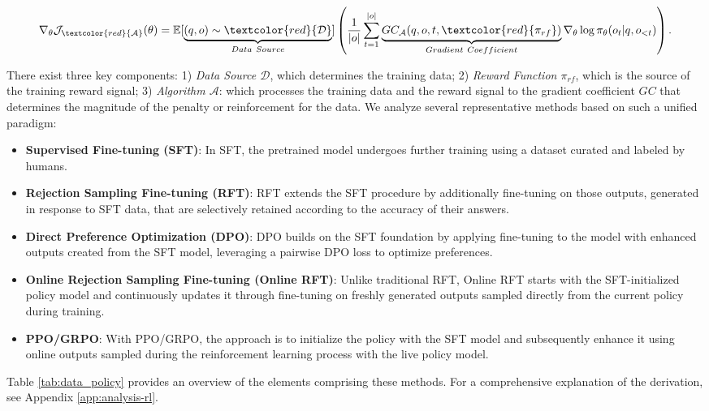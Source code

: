 \begin{itemize}[topsep=0pt]
\begin{itemize}[topsep=0pt]
\begin{equation}
    \nabla_{\theta}\mathcal{J}_{\textcolor{red}{\mathcal{A}}}(\theta) = \mathbb{E}[\underbrace{(q,o) \sim \textcolor{red}{\mathcal{D}}}_{Data \ Source}]\left( \frac{1}{|o|} \sum_{t=1}^{|o|}  \underbrace{GC_{{\mathcal{A}}}(q, o, t, \textcolor{red}{\pi_{{rf}}})}_{Gradient \ Coefficient}  \nabla_{\theta}\log \pi_{\theta}(o_t | q, o_{<t})\right).
\label{eq:objective}
\end{equation}

There exist three key components: 1) \textit{Data Source $\mathcal{D}$}, which determines the training data; 2) \textit{Reward Function $\pi_{{rf}}$}, which is the source of the training reward signal; 3) \textit{Algorithm $\mathcal{A}$}: which processes the training data and the reward signal to the gradient coefficient $GC$ that determines the magnitude of the penalty or reinforcement for the data. We analyze several representative methods based on such a unified paradigm:

\begin{itemize}
    \item \textbf{Supervised Fine-tuning (SFT)}: In SFT, the pretrained model undergoes further training using a dataset curated and labeled by humans.
    \item \textbf{Rejection Sampling Fine-tuning (RFT)}: RFT extends the SFT procedure by additionally fine-tuning on those outputs, generated in response to SFT data, that are selectively retained according to the accuracy of their answers.
    \item \textbf{Direct Preference Optimization (DPO)}: DPO builds on the SFT foundation by applying fine-tuning to the model with enhanced outputs created from the SFT model, leveraging a pairwise DPO loss to optimize preferences.
    \item \textbf{Online Rejection Sampling Fine-tuning (Online RFT)}: Unlike traditional RFT, Online RFT starts with the SFT-initialized policy model and continuously updates it through fine-tuning on freshly generated outputs sampled directly from the current policy during training.
    \item \textbf{PPO/GRPO}: With PPO/GRPO, the approach is to initialize the policy with the SFT model and subsequently enhance it using online outputs sampled during the reinforcement learning process with the live policy model.
\end{itemize}

Table \ref{tab:data_policy} provides an overview of the elements comprising these methods. For a comprehensive explanation of the derivation, see Appendix \ref{app:analysis-rl}.


\end{itemize}
\end{itemize}
